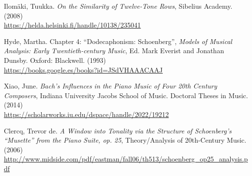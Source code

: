 \begin{thebibliography}{00}
			{ Ilom\"aki, Tuukka.}
			\textit{On the Similarity of Twelve-Tone Rows},
			Sibelius Academy.
			(2008)
			\\\url{https://helda.helsinki.fi/handle/10138/235041}
			
			{ Hyde, Martha.} Chapter 4: ``Dodecaphonism: Schoenberg'',
			\textit{Models of Musical Analysis: Early Twentieth-century Music},
			Ed. Mark Everist and Jonathan Dunsby.
			Oxford: Blackwell.
			(1993)
			\\\url{https://books.google.es/books?id=JSdVHAAACAAJ}
					
			{ Xiao, June.} 
			\textit{Bach's Influences in the Piano Music of Four 20th Century Composers},
			Indiana University Jacobs School of Music.
			Doctoral Theses in Music.
			(2014)
			\\\url{https://scholarworks.iu.edu/dspace/handle/2022/19212}
			
			{ Clercq, Trevor de.} 
			\textit{A Window into Tonality via the Structure of Schoenberg's ``Musette'' from the Piano Suite, op. 25},
			Theory/Analysis of 20th-Century Music.
			(2006)
			\\\url{http://www.midside.com/pdf/eastman/fall06/th513/schoenberg_op25_analysis.pdf}
			
%			
%			
%			
%			
%			
%			
			

\end{thebibliography}
